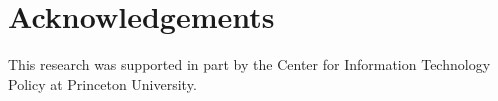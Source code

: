\section*{Acknowledgements}
This research was supported in part by the Center for Information Technology
Policy at Princeton University.
